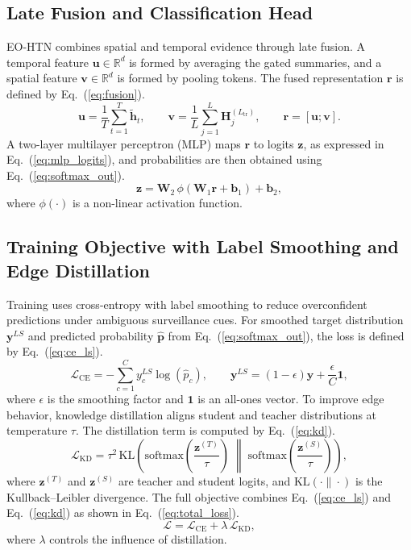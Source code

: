 \documentclass[AMA,Times1COL]{WileyNJDv5} %
\begin{document}
\subsection{Late Fusion and Classification Head}
EO-HTN combines spatial and temporal evidence through late fusion. A temporal feature $\mathbf{u}\in\mathbb{R}^{d}$ is formed by averaging the gated summaries, and a spatial feature $\mathbf{v}\in\mathbb{R}^{d}$ is formed by pooling tokens. The fused representation $\mathbf{r}$ is defined by Eq.~(\ref{eq:fusion}).
\begin{equation}
\mathbf{u} = \frac{1}{T}\sum_{t=1}^{T}\tilde{\mathbf{h}}_t, \qquad
\mathbf{v} = \frac{1}{L}\sum_{j=1}^{L}\mathbf{H}^{(L_{\mathrm{tr}})}_j, \qquad
\mathbf{r} = [\mathbf{u};\mathbf{v}] .
\label{eq:fusion}
\end{equation}
A two-layer multilayer perceptron (MLP) maps $\mathbf{r}$ to logits $\mathbf{z}$, as expressed in Eq.~(\ref{eq:mlp_logits}), and probabilities are then obtained using Eq.~(\ref{eq:softmax_out}).
\begin{equation}
\mathbf{z} = \mathbf{W}_2\,\phi(\mathbf{W}_1\mathbf{r}+\mathbf{b}_1)+\mathbf{b}_2,
\label{eq:mlp_logits}
\end{equation}
where $\phi(\cdot)$ is a non-linear activation function.


\subsection{Training Objective with Label Smoothing and Edge Distillation}
Training uses cross-entropy with label smoothing to reduce overconfident predictions under ambiguous surveillance cues. For smoothed target distribution $\mathbf{y}^{LS}$ and predicted probability $\hat{\mathbf{p}}$ from Eq.~(\ref{eq:softmax_out}), the loss is defined by Eq.~(\ref{eq:ce_ls}).
\begin{equation}
\mathcal{L}_{\mathrm{CE}} = -\sum_{c=1}^{C} y^{LS}_c \log(\hat{p}_c), \qquad
\mathbf{y}^{LS} = (1-\epsilon)\mathbf{y} + \frac{\epsilon}{C}\mathbf{1},
\label{eq:ce_ls}
\end{equation}
where $\epsilon$ is the smoothing factor and $\mathbf{1}$ is an all-ones vector. To improve edge behavior, knowledge distillation aligns student and teacher distributions at temperature $\tau$. The distillation term is computed by Eq.~(\ref{eq:kd}).
\begin{equation}
\mathcal{L}_{\mathrm{KD}} = \tau^2\,\mathrm{KL}\!\left(\mathrm{softmax}\!\left(\frac{\mathbf{z}^{(T)}}{\tau}\right)\;\middle\|\;\mathrm{softmax}\!\left(\frac{\mathbf{z}^{(S)}}{\tau}\right)\right),
\label{eq:kd}
\end{equation}
where $\mathbf{z}^{(T)}$ and $\mathbf{z}^{(S)}$ are teacher and student logits, and $\mathrm{KL}(\cdot\|\cdot)$ is the Kullback--Leibler divergence. The full objective combines Eq.~(\ref{eq:ce_ls}) and Eq.~(\ref{eq:kd}) as shown in Eq.~(\ref{eq:total_loss}).
\begin{equation}
\mathcal{L} = \mathcal{L}_{\mathrm{CE}} + \lambda\,\mathcal{L}_{\mathrm{KD}},
\label{eq:total_loss}
\end{equation}
where $\lambda$ controls the influence of distillation.
\end{document}
